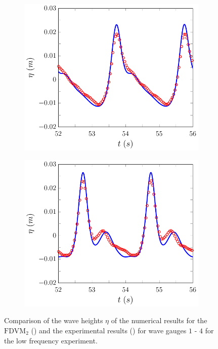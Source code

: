 \begin{figure}
\begin{subfigure}{0.5\textwidth}
		\vspace{0.5cm}
	\end{subfigure}
	\begin{subfigure}{0.5\textwidth}
		\includegraphics[width=\textwidth]{./chp6/figures/Experiment/Beji/sl/FDVMWG3.pdf}
		\vspace{0.5cm}
	\end{subfigure}%
	\begin{subfigure}{0.5\textwidth}
		\includegraphics[width=\textwidth]{./chp6/figures/Experiment/Beji/sl/FDVMWG4.pdf}
		\vspace{0.5cm}
	\end{subfigure}
	\caption{Comparison of the wave heights $\eta$ of the numerical results for the $\text{FDVM}_2$ ({\color{blue}\solidrule}) and the experimental results () for wave gauges $1$ - $4$ for the low frequency experiment.}
	\label{fig:BejislWG1to4FDVM}
\end{figure}

